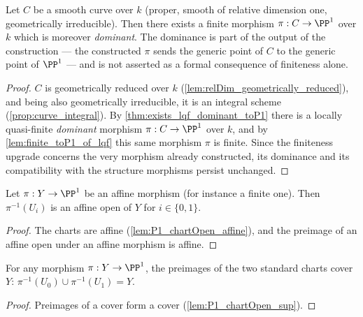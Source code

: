 \begin{theorem}
  \label{thm:exists_finite_dominant_toP1}
  \leanok
  Let \(C\) be a smooth curve over \(k\) (proper, smooth of relative dimension one,
  geometrically irreducible). Then there exists a finite morphism \(\pi : C \to \PP^1\)
  over \(k\) which is moreover \emph{dominant}. The dominance is part of the output of the
  construction --- the constructed \(\pi\) sends the generic point of \(C\) to the generic
  point of \(\PP^1\) --- and is not asserted as a formal consequence of finiteness alone.
\end{theorem}
\begin{proof}
  \leanok
  \(C\) is geometrically reduced over \(k\) (\ref{lem:relDim_geometrically_reduced}), and
  being also geometrically irreducible, it is an integral scheme
  (\ref{prop:curve_integral}). By \ref{thm:exists_lqf_dominant_toP1} there is a locally
  quasi-finite \emph{dominant} morphism \(\pi : C \to \PP^1\) over \(k\), and by
  \ref{lem:finite_toP1_of_lqf} this same morphism \(\pi\) is finite. Since the finiteness
  upgrade concerns the very morphism already constructed, its dominance and its
  compatibility with the structure morphisms persist unchanged.
\end{proof}

\begin{lemma}
  \label{lem:preimage_chart_affine}
  \leanok
  Let \(\pi : Y \to \PP^1\) be an affine morphism (for instance a finite one). Then
  \(\pi^{-1}(U_i)\) is an affine open of \(Y\) for \(i \in \{0,1\}\).
\end{lemma}
\begin{proof}
  \leanok
  The charts are affine (\ref{lem:P1_chartOpen_affine}), and the preimage of an affine open
  under an affine morphism is affine.
\end{proof}

\begin{lemma}
  \label{lem:preimage_chart_sup}
  \leanok
  For any morphism \(\pi : Y \to \PP^1\), the preimages of the two standard charts cover
  \(Y\): \(\pi^{-1}(U_0) \cup \pi^{-1}(U_1) = Y\).
\end{lemma}
\begin{proof}
  \leanok
  Preimages of a cover form a cover (\ref{lem:P1_chartOpen_sup}).
\end{proof}

